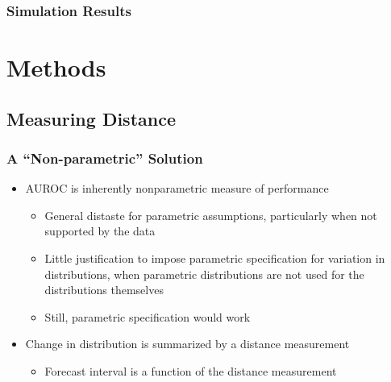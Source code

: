 \documentclass{beamer}
\begin{document}

\begin{frame}
\frametitle{Simulation Results}




\end{frame}




\section{Methods}
\subsection{Measuring Distance}



\begin{frame}
\frametitle{A ``Non-parametric'' Solution}


\begin{itemize}
    \item AUROC is inherently nonparametric measure of performance
    \begin{itemize}
        \item General distaste for parametric assumptions, particularly when not supported by the data
        \item Little justification to impose parametric specification for variation in distributions, when parametric distributions are not used for the distributions themselves
        \item Still, parametric specification would work
    \end{itemize}
    \item Change in distribution is summarized by a distance measurement 
    \begin{itemize}
        \item Forecast interval is a function of the distance measurement
    \end{itemize}
\end{itemize}
    
\end{frame}
\end{document}
